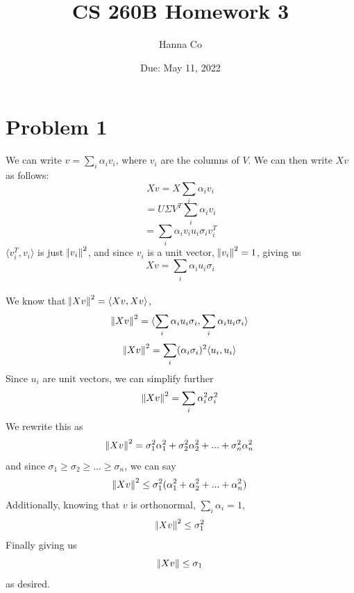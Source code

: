 \documentclass[12pt, letterpaper]{article}
\title{CS 260B Homework 3}
\author{Hanna Co}
\affil{Collaborators: Isha Gonugunta}
\date{Due: May 11, 2022}
\begin{document}
\maketitle
\newpage
\section{Problem 1}
We can write $v=\sum_i \alpha_i v_i$, where $v_i$ are the columns of $V$. We can then write $Xv$ as follows:
\[Xv=X\sum_i \alpha_i v_i\]
\[=U\Sigma V^T\sum_i \alpha_i v_i\]
\[=\sum_i \alpha_i v_iu_i\sigma_iv^T_i\]
$\langle v^T_i,v_i\rangle$ is just $\norm{v_i}^2$, and since $v_i$ is a unit vector, $\norm{v_i}^2 = 1$, giving us
\[Xv=\sum_i \alpha_i u_i\sigma_i\]
\\
We know that $\norm{Xv}^2=\langle Xv,Xv\rangle$,
\[\norm{Xv}^2=\langle \sum_i \alpha_i u_i\sigma_i,\sum_i \alpha_i u_i\sigma_i\rangle\]
\[\norm{Xv}^2=\sum_i (\alpha_i\sigma_i)^2\langle u_i,u_i\rangle\]
Since $u_i$ are unit vectors, we can simplify further
\[\norm{Xv}^2=\sum_i \alpha_i^2\sigma_i^2\]
We rewrite this as
\[\norm{Xv}^2 = \sigma_1^2\alpha_1^2+\sigma_2^2\alpha_2^2 + ...  + \sigma_n^2\alpha_n^2\]
and since $\sigma_1 \geq \sigma_2 \geq ... \geq \sigma_n$, we can say
\[\norm{Xv}^2\leq\sigma_1^2(\alpha_1^2+\alpha_2^2+...+\alpha_n^2)\]
Additionally, knowing that $v$ is orthonormal, $\sum_i\alpha_i = 1$,
\[\norm{Xv}^2\leq\sigma_1^2\]
Finally giving us
\[\norm{Xv}\leq\sigma_1\]
as desired.

\newpage
\end{document}
